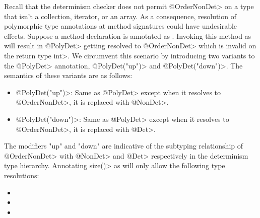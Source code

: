 Recall that the determinism checker does not permit \<@OrderNonDet> on a type that isn't a collection, iterator, or an array.
As a consequence, resolution of polymorphic type annotations at method signatures could have undesirable effects.
Suppose a method declaration is annotated as . Invoking this method
as  will result in \<@PolyDet> getting resolved to \<@OrderNonDet> which is invalid
on the return type \<int>. We circumvent this scenario by introducing two variants to the \<@PolyDet> annotation, \<@PolyDet("up")>
and \<@PolyDet("down")>. The semantics of these variants are as follows:
\begin{itemize}
	\item \<@PolyDet("up")>: Same as \<@PolyDet> except when it resolves to \<@OrderNonDet>, it is replaced with \<@NonDet>.
	\item \<@PolyDet("down")>: Same as \<@PolyDet> except when it resolves to \<@OrderNonDet>, it is replaced with \<@Det>.
\end{itemize} 
The modifiers "up" and "down" are indicative of the subtyping relationship of \<@OrderNonDet> with \<@NonDet> and \<@Det> respectively
in the determinism type hierarchy.
Annotating \<size()> as  will only allow the following type resolutions:
\begin{itemize}
	\item {}
	\item {}
	\item {}
\end{itemize}


